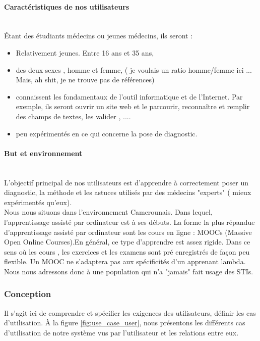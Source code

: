     \paragraph{Caractéristiques de nos utilisateurs} \hfill \\
    Étant des étudiants médecins ou jeunes médecins, ils seront :
    \begin{itemize}
        \item Relativement jeunes. Entre 16 ans et 35 ans,
        \item des deux sexes , homme et femme, ( je voulais un ratio homme/femme ici ... Mais, ah shit, je ne trouve pas de références)
        \item connaissent les fondamentaux de l'outil informatique et de l'Internet. Par exemple, ils seront ouvrir un site web et le parcourir, reconnaître et remplir des champs de textes, les valider , ....
        
        \item peu expérimentés en ce qui concerne la pose de diagnostic.
    \end{itemize}
    
    \paragraph{But et environnement} \hfill \\
    L'objectif principal de nos utilisateurs est d'apprendre à correctement poser un diagnostic, la méthode et les astuces utilisés par des médecins "experts" ( mieux expérimentés qu'eux). \\
    Nous nous situons dans l'environnement Camerounais. Dans lequel, l'apprentissage assisté par ordinateur est à ses débuts. La forme la plus répandue d'apprentissage assisté par ordinateur sont les cours en ligne : MOOCs (Massive Open Online Courses).En général, ce type d'apprendre est assez rigide. Dans ce sens où les cours , les exercices et les examens sont pré enregistrés de façon peu flexible. Un MOOC ne s'adaptera pas aux spécificités d'un apprenant lambda. Nous nous adressons donc à une population qui n'a "jamais" fait usage des STIs.
    
    \subsubsection{Conception}
    Il s'agit ici de comprendre et spécifier les exigences des utilisateurs, définir les cas d'utilisation.
    À la figure \ref{fig:use_case_user}, nous présentons les différents cas d'utilisation de notre système vus par l'utilisateur et les relations entre eux.
    
